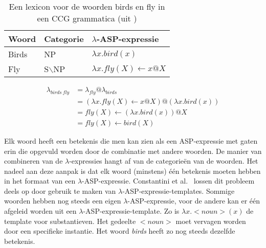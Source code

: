 \begin{table}
  \centering
  \begin{tabular}{|l|l|l|}
    \hline
    Woord & Categorie & $\lambda$-ASP-expressie \\
    \hline
    \hline
    Birds & NP & $\lambda x.bird(x)$ \\
    Fly & S$\backslash$NP & $\lambda x.fly(X) \leftarrow x@X$ \\
    \hline
  \end{tabular}
  \caption{Een lexicon voor de woorden birds en fly in een CCG grammatica (uit \cite{Baral2008})}
  \label{table:CCG}
\end{table}

\begin{equation}
  \label{eq:lambda}
  \begin{align*}
  \lambda_{birds\ fly} &= \lambda_{fly}@\lambda_{birds} \\
          &= (\lambda x.fly(X) \leftarrow x@X)@(\lambda x.bird(x)) \\
          &= fly(X) \leftarrow (\lambda x.bird(x))@X \\
          &= fly(X) \leftarrow bird(X)
  \end{align*}
\end{equation}

Elk woord heeft een betekenis die men kan zien als een ASP-expressie met gaten erin die opgevuld worden door de combinatie met andere woorden. De manier van combineren van de $\lambda$-expressies hangt af van de categorie\"en van de woorden. Het nadeel aan deze aanpak is dat elk woord (minstens) \'e\'en betekenis moeten hebben in het formaat van een $\lambda$-ASP-expressie. Constantini et al.\ \cite{Costantini2010} lossen dit probleem deels op door gebruik te maken van $\lambda$-ASP-expressie-templates. Sommige woorden hebben nog steeds een eigen $\lambda$-ASP-expressie, voor de andere kan er \'e\'en afgeleid worden uit een $\lambda$-ASP-expressie-template. Zo is $\lambda x. <noun>(x)$ de template voor substantieven. Het gedeelte $<noun>$ moet vervagen worden door een specifieke instantie. Het woord \textit{birds} heeft zo nog steeds dezelfde betekenis.


